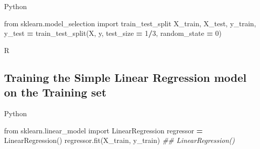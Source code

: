 \documentclass[
]{book}
\newenvironment{Shaded}{\begin{snugshade}}{\end{snugshade}}
\newcommand{\AttributeTok}[1]{\textcolor[rgb]{0.77,0.63,0.00}{#1}}
\newcommand{\CommentTok}[1]{\textcolor[rgb]{0.56,0.35,0.01}{\textit{#1}}}
\newcommand{\ConstantTok}[1]{\textcolor[rgb]{0.00,0.00,0.00}{#1}}
\newcommand{\DecValTok}[1]{\textcolor[rgb]{0.00,0.00,0.81}{#1}}
\newcommand{\FunctionTok}[1]{\textcolor[rgb]{0.00,0.00,0.00}{#1}}
\newcommand{\ImportTok}[1]{#1}
\newcommand{\NormalTok}[1]{#1}
\newcommand{\OperatorTok}[1]{\textcolor[rgb]{0.81,0.36,0.00}{\textbf{#1}}}
\newcommand{\OtherTok}[1]{\textcolor[rgb]{0.56,0.35,0.01}{#1}}
\newcommand{\SpecialCharTok}[1]{\textcolor[rgb]{0.00,0.00,0.00}{#1}}
\theoremstyle{definition}
\theoremstyle{definition}
\theoremstyle{definition}
\theoremstyle{definition}
\theoremstyle{remark}
\begin{document}
Python

\begin{Shaded}
\begin{Highlighting}[]
\ImportTok{from}\NormalTok{ sklearn.model\_selection }\ImportTok{import}\NormalTok{ train\_test\_split}
\NormalTok{X\_train, X\_test, y\_train, y\_test }\OperatorTok{=}\NormalTok{ train\_test\_split(X, y, test\_size }\OperatorTok{=} \DecValTok{1}\OperatorTok{/}\DecValTok{3}\NormalTok{, random\_state }\OperatorTok{=} \DecValTok{0}\NormalTok{)}
\end{Highlighting}
\end{Shaded}

R

\begin{Shaded}
\end{Shaded}

\hypertarget{training-the-simple-linear-regression-model-on-the-training-set}{%
\subsection{Training the Simple Linear Regression model on the Training set}\label{training-the-simple-linear-regression-model-on-the-training-set}}

Python

\begin{Shaded}
\begin{Highlighting}[]
\ImportTok{from}\NormalTok{ sklearn.linear\_model }\ImportTok{import}\NormalTok{ LinearRegression}
\NormalTok{regressor }\OperatorTok{=}\NormalTok{ LinearRegression()}
\NormalTok{regressor.fit(X\_train, y\_train)}
\CommentTok{\#\# LinearRegression()}
\end{Highlighting}
\end{Shaded}
\end{document}
